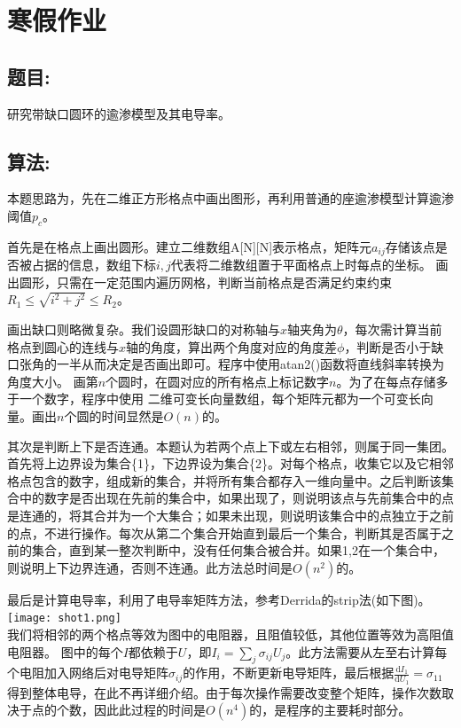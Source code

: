 \documentclass[utf8]{ctexart}
\author{syx}
\begin{document}
	\section*{寒假作业}
	\subsection*{题目:}
	研究带缺口圆环的逾渗模型及其电导率。
	\subsection*{算法:}
	本题思路为，先在二维正方形格点中画出图形，再利用普通的座逾渗模型计算逾渗阈值$p_c$。

	首先是在格点上画出圆形。建立二维数组A[N][N]表示格点，矩阵元$a_{ij}$存储该点是否被占据的信息，数组下标$i,j$代表将二维数组置于平面格点上时每点的坐标。
	画出圆形，只需在一定范围内遍历网格，判断当前格点是否满足约束约束$R_1\leq\sqrt{i^2+j^2}\leq R_2$。

	画出缺口则略微复杂。我们设圆形缺口的对称轴与$x$轴夹角为$\theta$，每次需计算当前格点到圆心的连线与$x$轴的角度，算出两个角度对应的角度差$\phi$，判断是否小于缺口张角的一半从而决定是否画出即可。程序中使用atan2()函数将直线斜率转换为角度大小。
	画第$n$个圆时，在圆对应的所有格点上标记数字$n$。为了在每点存储多于一个数字，程序中使用
	二维可变长向量数组，每个矩阵元都为一个可变长向量。画出$n$个圆的时间显然是$O(n)$的。

	其次是判断上下是否连通。本题认为若两个点上下或左右相邻，则属于同一集团。首先将上边界设为集合\{1\}，下边界设为集合\{2\}。对每个格点，收集它以及它相邻格点包含的数字，组成新的集合，并将所有集合都存入一维向量中。之后判断该集合中的数字是否出现在先前的集合中，如果出现了，则说明该点与先前集合中的点是连通的，将其合并为一个大集合；如果未出现，则说明该集合中的点独立于之前的点，不进行操作。每次从第二个集合开始直到最后一个集合，判断其是否属于之前的集合，直到某一整次判断中，没有任何集合被合并。如果1,2在一个集合中，则说明上下边界连通，否则不连通。此方法总时间是$O(n^2)$的。

	最后是计算电导率，利用了电导率矩阵方法，参考Derrida的strip法(如下图)。\\
	\texttt{[image: shot1.png]}\\
	
	我们将相邻的两个格点等效为图中的电阻器，且阻值较低，其他位置等效为高阻值电阻器。
	图中的每个$I$都依赖于$U$，即$I_i=\sum_{j}\sigma_{ij}U_j$。此方法需要从左至右计算每个电阻加入网络后对电导矩阵$\sigma_{ij}$的作用，不断更新电导矩阵，最后根据$\frac{\mathrm{d}I_1}{\mathrm{d}U_1}=\sigma_{11}$得到整体电导，在此不再详细介绍。由于每次操作需要改变整个矩阵，操作次数取决于点的个数，因此此过程的时间是$O(n^4)$的，是程序的主要耗时部分。
\end{document}
